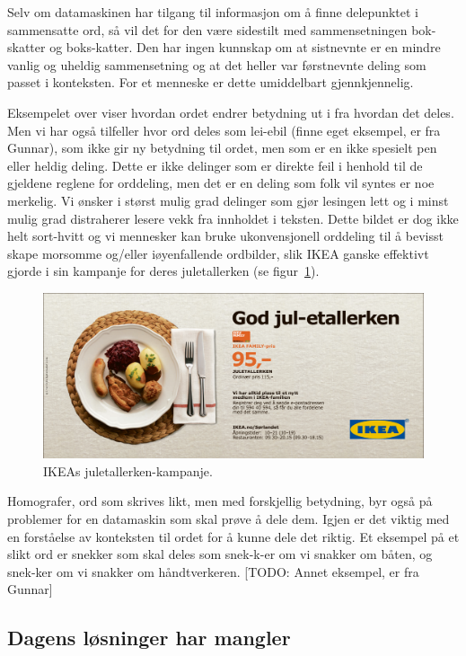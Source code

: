 Selv om datamaskinen har tilgang til informasjon om å finne delepunktet i sammensatte ord, så vil det for den være sidestilt med sammensetningen bok-skatter og boks-katter. Den har ingen kunnskap om at sistnevnte er en mindre vanlig og uheldig sammensetning og at det heller var førstnevnte deling som passet i konteksten. For et menneske er dette umiddelbart gjennkjennelig.

Eksempelet over viser hvordan ordet endrer betydning ut i fra hvordan det deles. Men vi har også tilfeller hvor ord deles som lei-ebil (finne eget eksempel, er fra Gunnar), som ikke gir ny betydning til ordet, men som er en ikke spesielt pen eller heldig deling. Dette er ikke delinger som er direkte feil i henhold til de gjeldene reglene for orddeling, men det er en deling som folk vil syntes er noe merkelig. Vi ønsker i størst mulig grad delinger som gjør lesingen lett og i minst mulig grad distraherer lesere vekk fra innholdet i teksten. Dette bildet er dog ikke helt sort-hvitt og vi mennesker kan bruke ukonvensjonell orddeling til å bevisst skape morsomme og/eller iøyenfallende ordbilder, slik IKEA ganske effektivt gjorde i sin kampanje for deres juletallerken (se figur~\ref{fig:ikea}).


\begin{figure}
\includegraphics[width=\textwidth]{content/figures/jul-etallerken.pdf}
\caption{IKEAs juletallerken-kampanje.}
\label{fig:ikea}
\end{figure}

Homografer, ord som skrives likt, men med forskjellig betydning, byr også på problemer for en datamaskin som skal prøve å dele dem. Igjen er det viktig med en forståelse av konteksten til ordet for å kunne dele det riktig. Et eksempel på et slikt ord er snekker som skal deles som snek-k-er om vi snakker om båten, og snek-ker om vi snakker om håndtverkeren. [TODO: Annet eksempel, er fra Gunnar]

\subsection{Dagens løsninger har mangler}

